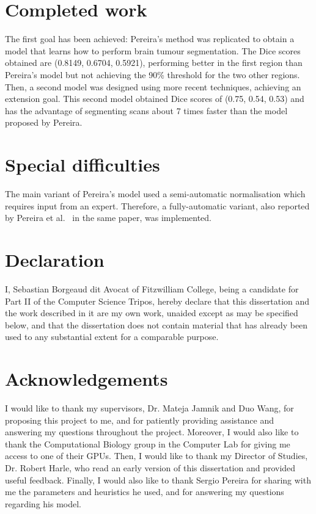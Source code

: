 \documentclass[12pt,a4paper,twoside,openright]{report}
\begin{document}
\section*{Completed work}
The first goal has been achieved: Pereira's method was replicated to obtain a model that learns how to perform brain tumour segmentation. The Dice scores obtained are (0.8149, 0.6704, 0.5921), performing better in the first region than Pereira's model but not achieving the 90\% threshold for the two other regions. Then, a second model was designed using more recent techniques, achieving an extension goal. This second model obtained Dice scores of (0.75, 0.54, 0.53) and has the advantage of segmenting scans about 7 times faster than the model proposed by Pereira.

\section*{Special difficulties}
The main variant of Pereira's model used a semi-automatic normalisation which requires input from an expert. Therefore, a fully-automatic variant, also reported by Pereira et al.\ \cite{pereira} in the same paper, was implemented.
\newpage
\section*{Declaration}

I, Sebastian Borgeaud dit Avocat of Fitzwilliam College, being a candidate for Part II of the Computer Science Tripos, hereby declare
that this dissertation and the work described in it are my own work,
unaided except as may be specified below, and that the dissertation
does not contain material that has already been used to any substantial
extent for a comparable purpose.

\bigskip
{}

\tableofcontents

{\listoffigures \let\cleardoublepage\clearpage \listoftables}


\newpage

\setlength{\parskip}{1em} %

\section*{Acknowledgements}
I would like to thank my supervisors, Dr. Mateja Jamnik and Duo Wang, for proposing this project to me, and for patiently providing assistance and answering my questions throughout the project. Moreover, I would also like to thank the Computational Biology group in the Computer Lab for giving me access to one of their GPUs. Then, I would like to thank my Director of Studies, Dr. Robert Harle, who read an early version of this dissertation and provided useful feedback. Finally, I would also like to thank Sergio Pereira for sharing with me the parameters and heuristics he used, and for answering my questions regarding his model.
\end{document}
